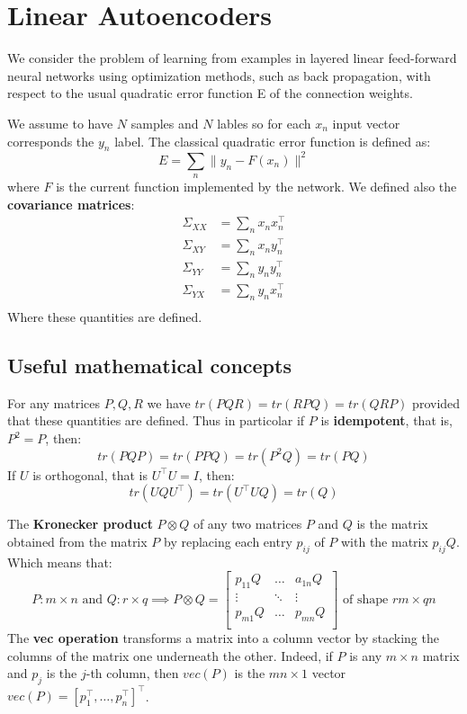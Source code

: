 \section{Linear Autoencoders}
We consider the problem of learning from examples in layered linear feed-forward neural networks using optimization methods, such as back propagation, with respect to the usual quadratic error function E of the connection weights. 

We assume to have $N$ samples and $N$ lables so for each $x_n$ input vector corresponds the $y_n$ label. The classical quadratic error function is defined as:
\[
E = \sum_n \|y_n - F(x_n)\|^2 
\]
where $F$ is the current function implemented by the network. We defined also the \textbf{covariance matrices}:
\[
\begin{split}
    \Sigma_{XX} &= \sum_n x_n x_n^\intercal\\
    \Sigma_{XY} &= \sum_n x_n y_n^\intercal\\
    \Sigma_{YY} &= \sum_n y_n y_n^\intercal\\
    \Sigma_{YX} &= \sum_n y_n x_n^\intercal\\
\end{split}
\]
Where these quantities are defined. 

\subsection{Useful mathematical concepts}
For any matrices $P, Q, R$ we have $tr(PQR) = tr(RPQ) = tr(QRP)$ provided that these quantities are defined. Thus in particolar if $P$ is \textbf{idempotent}, that is, $P^2 = P$, then:
\begin{equation}\tag{a}
    tr(PQP) = tr(PPQ) = tr(P^2Q) = tr(PQ)
\end{equation}
If $U$ is orthogonal, that is $U^\intercal U = I$, then:
\begin{equation}\tag{b}
    tr(UQU^\intercal) = tr(U^\intercal UQ) = tr(Q)
\end{equation}

The \textbf{Kronecker product} $P \otimes Q$ of any two matrices $P$ and $Q$ is the matrix obtained from the matrix $P$ by replacing each entry $p_{ij}$ of $P$ with the matrix $p_{ij}Q$. Which means that:
\[P: m\times n \text{ and } Q:r\times q \implies 
P \otimes Q = \begin{bmatrix}
    p_{11}Q & \dots & a_{1n}Q\\
    \vdots & \ddots & \vdots\\
    p_{m1}Q & \dots & p_{mn}Q\\
\end{bmatrix}
\text{ of shape } rm\times qn
\]
The \textbf{vec operation} transforms a matrix into a column vector by stacking the columns of the matrix one underneath the other. Indeed, if $P$ is any $m \times n$ matrix and $p_j$ is the $j$-th column, then $vec(P)$ is the $mn\times 1$ vector $vec(P) = [p_1^\intercal, \dots, p_n^\intercal]^\intercal$.

